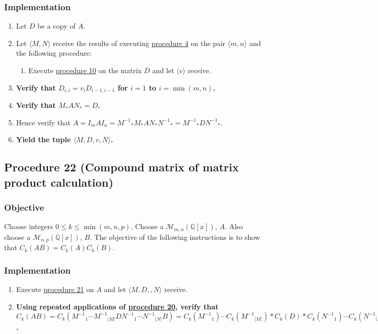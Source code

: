 \documentclass[twocolumn]{article}
\begin{document}
			\subsubsection{Implementation}
				\begin{enumerate}
					\item Let $D$ be a copy of $A$.
					\item Let $\langle M,N\rangle$ receive the results of executing \hyperref[sec:procedure 4]{procedure 4} on the pair $\langle m,n\rangle$ and the following procedure:
						\begin{enumerate}
							\item Execute \hyperref[sec:procedure 10]{procedure 10} on the matrix $D$ and let $\langle v\rangle$ receive.
						\end{enumerate}
					\item \textbf{Verify that $D_{i,i}=v_iD_{i-1,i-1}$ for $i=1$ to $i=\min(m,n)$.}
					\item \textbf{Verify that $M_*AN_*=D$.}
					\item Hence verify that $A=I_mAI_n={M^{-1}}_*M_*AN_*{N^{-1}}_*={M^{-1}}_*D{N^{-1}}_*$.
					\item \textbf{Yield the tuple $\langle M,D,v,N\rangle$.}
				\end{enumerate}
		\subsection{Procedure 22 (Compound matrix of matrix product calculation)}\label{sec:procedure 22}
			\subsubsection{Objective}
				Choose integers $0\le k\le\min(m,n,p)$. Choose a $\mathcal{M}_{m,n}(\mathbb{Q}[x])$, $A$. Also choose a $\mathcal{M}_{n,p}(\mathbb{Q}[x])$, $B$. The objective of the following instructions is to show that $C_k(AB)=C_k(A)C_k(B)$.
			\subsubsection{Implementation}
				\begin{enumerate}
					\item Execute \hyperref[sec:procedure 21]{procedure 21} on $A$ and let $\langle M,D,,N\rangle$ receive.
					\item \textbf{Using repeated applications of \hyperref[sec:procedure 20]{procedure 20}, verify that $C_k(AB)=C_k({M^{-1}}_1\cdots {M^{-1}}_{\lvert M\rvert}D{N^{-1}}_1\cdots {N^{-1}}_{\lvert N\rvert}B)=C_k({M^{-1}}_1)\cdots C_k({M^{-1}}_{\lvert M\rvert})*C_k(D)*C_k({N^{-1}}_1)\cdots C_k({N^{-1}}_{\lvert N\rvert})C_k(B)=C_k({M^{-1}}_1\cdots {M^{-1}}_{\lvert M\rvert}D{N^{-1}}_1\cdots {N^{-1}}_{\lvert N\rvert})C_k(B)=C_k(A)C_k(B)$.}
				\end{enumerate}
\end{document}
